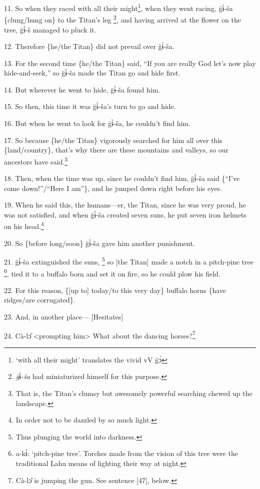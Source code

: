 11. So when they raced with all their might\footnote{`with all their might' translates the vivid vV g̈ɔ̀}, when they went racing, g̈ɨ̀-ša
\{clung/hung on\} to the Titan's leg \footnote{\textit{g̈}ɨ̀\textit{-ša }had miniaturized himself for this purpose.}, and having arrived at the flower on the
tree, g̈ɨ̀-š managed to pluck it.

12. Therefore \{he/the Titan\} did not prevail over g̈ɨ̀-ša.

13. For the second time \{he/the Titan\} said, ``If you are really God let's now
play hide-and-seek,'' so g̈ɨ̀-ša made the Titan go and hide first.

14. But wherever he went to hide, g̈ɨ̀-ša found him.

15. So then, this time it was g̈ɨ̀-ša's turn to go and hide.

16. But when he went to look for g̈ɨ̀-ša, he couldn't find him.

17. So because \{he/the Titan\} vigorously searched for him all over this \{land/country\},
that's why there are these mountains and valleys, so our ancestors have said.\footnote{That is, the Titan's clumsy but awesomely powerful searching chewed up the landscape.}

18. Then, when the time was up, since he couldn't find him, g̈ɨ̀-ša said \{``I've
come down!''/``Here I am''\}, and he jumped down right before his eyes.

19. When he said this, the humans---er, the Titan, since he was very proud, he
was not satisfied, and when g̈ɨ̀-ša created seven suns, he put seven iron helmets
on his head.\footnote{In order not to be dazzled by so much light.}

20. So \{before long/soon\} g̈ɨ̀-ša gave him another punishment.

21. g̈ɨ̀-ša extinguished the suns, \footnote{Thus plunging the world into darkness.} so [the Titan] made a notch in a pitch-pine
tree \footnote{a-kɨ́: `pitch-pine tree'. Torches made from the vision of this tree were the traditional Lahu means of lighting their way at night.}, tied it to a buffalo born and set it on fire, so he could plow his field.

22. For this reason, \{[up to] today/to this very day\} buffalo horns \{have ridges/are
corrugated\}.

23. And, in another place--- [Hesitates]

24. Cà-lɔ̂ <prompting him> What about the dancing horses?\footnote{Cà-lɔ̂ is jumping the gun. See sentence [47], below.}

